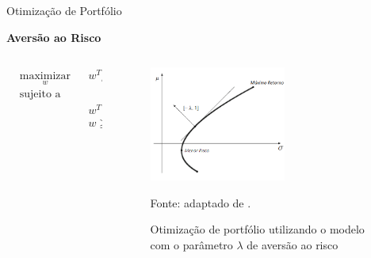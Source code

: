    \begin{frame}{Otimização de Portfólio}

        \LARGE \textbf{Aversão ao Risco}

        \begin{columns}
            \begin{column}{0.5\textwidth}

                \begin{equation}
                    \label{eq:aversao}
                    \begin{aligned}
                        & \underset{w}{\text{maximizar}}
                        & & w^T \mu - \lambda w^T \Sigma w \\
                        & \text{sujeito a} \\
                        & & & w^T \mathbf{1} = 1 \\
                        & & & w \geq 0
                    \end{aligned}
                \end{equation}
            \end{column}

            \begin{column}{0.5\textwidth}

                \begin{figure}[htbp]
                    \centering
                    \caption{Otimização de portfólio utilizando o modelo com o parâmetro $\lambda$ de aversão ao risco}
                    \label{fig:aversao}
                    \includegraphics[width=0.6\textwidth]{images/aversao.png}
                    \par \footnotesize Fonte: adaptado de \citeauthor{mansini2015linear}.
                \end{figure}
        
            \end{column}
        \end{columns}

    \end{frame}




